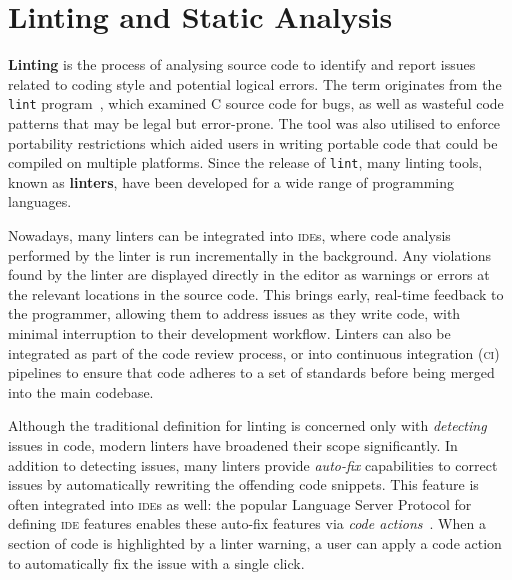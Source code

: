 \documentclass[../../main.tex]{subfiles}
\begin{document}
\section{Linting and Static Analysis}



\textbf{Linting} is the process of analysing source code to identify and report issues related to coding style and potential logical errors.
The term originates from the \texttt{lint} program~\cite{johnson_lint_1978}, which examined C source code for bugs, as well as wasteful code patterns that may be legal but error-prone.
The tool was also utilised to enforce portability restrictions which aided users in writing portable code that could be compiled on multiple platforms.
Since the release of \texttt{lint}, many linting tools, known as \textbf{linters}, have been developed for a wide range of programming languages.

Nowadays, many linters can be integrated into \textsc{ide}s, where code analysis performed by the linter is run incrementally in the background.
Any violations found by the linter are displayed directly in the editor as warnings or errors at the relevant locations in the source code.
This brings early, real-time feedback to the programmer, allowing them to address issues as they write code, with minimal interruption to their development workflow.
Linters can also be integrated as part of the code review process, or into continuous integration (\textsc{ci}) pipelines to ensure that code adheres to a set of standards before being merged into the main codebase.

Although the traditional definition for linting is concerned only with \emph{detecting} issues in code, modern linters have broadened their scope significantly.
In addition to detecting issues, many linters provide \emph{auto-fix} capabilities to correct issues by automatically rewriting the offending code snippets.
This feature is often integrated into \textsc{ide}s as well: the popular Language Server Protocol for defining \textsc{ide} features enables these auto-fix features via \emph{code actions}~\cite{gunasinghe_lsp_2022}.
When a section of code is highlighted by a linter warning, a user can apply a code action to automatically fix the issue with a single click.
\end{document}
